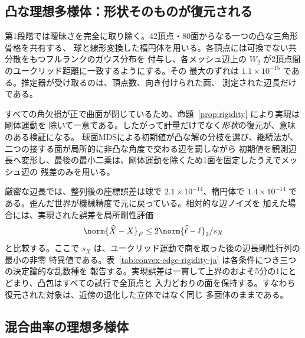 \subsection{凸な理想多様体：形状そのものが復元される}
\label{sec:convex-experiment}

第1段階では曖昧さを完全に取り除く。42頂点・80面からなる一つの凸な三角形骨格を共有する、
球と線形変換した楕円体を用いる。各頂点には可換でない共分散をもつフルランクのガウス分布を
付与し、各メッシュ辺上の $W_2$ が2頂点間のユークリッド距離に一致するようにする。その
最大のずれは $1.1\times10^{-15}$ である。推定器が受け取るのは、頂点数、向き付けられた面、
測定された辺長だけである。

すべての角欠損が正で曲面が閉じているため、命題~\ref{prop:rigidity} により実現は剛体運動を
除いて一意である。したがって計量だけでなく\emph{形状}の復元が、意味のある検証になる。
球面MDSによる初期値が凸な解の分枝を選び、継続法が、二つの接する面が局所的に非凸な角度で交わる辺を罰しながら
初期値を観測辺長へ変形し、最後の最小二乗は、剛体運動を除くため1面を固定したうえでメッシュ辺の
残差のみを用いる。

厳密な辺長では、整列後の座標誤差は球で $2.1\times10^{-14}$、楕円体で
$1.4\times10^{-14}$ である。歪んだ世界が機械精度で元に戻っている。相対的な辺ノイズを
加えた場合には、実現された誤差を局所剛性評価
\begin{equation}
 \norm{\widehat X-X}_F\le 2\norm{\widehat\ell-\ell}_2/s_X
 \label{eq:rigidity-bound}
\end{equation}
と比較する。ここで $s_X$ は、ユークリッド運動で商を取った後の辺長剛性行列の最小の非零
特異値である。表~\ref{tab:convex-edge-rigidity-ja} は各条件につき三つの決定論的な乱数種を
報告する。実現誤差は一貫して上界のおよそ5分の1にとどまり、凸包はすべての試行で全頂点と
入力どおりの面を保持する。すなわち復元された対象は、近傍の退化した立体ではなく同じ
多面体のままである。



\subsection{混合曲率の理想多様体}
\label{sec:controlled-experiment}

